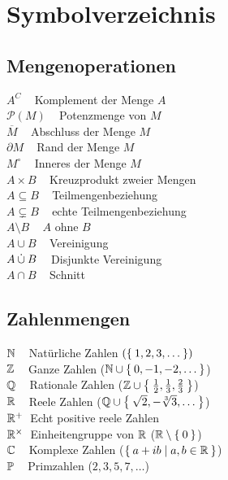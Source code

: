 \chapter*{Symbolverzeichnis}
\begin{minipage}[t]{0.45\textwidth}
\section*{Mengenoperationen}
$A^C\;\;\;$ Komplement der Menge $A$\\
$\mathcal{P}(M)\;\;\;$ Potenzmenge von $M$\\
$\overline{M}\;\;\;$ Abschluss der Menge $M$\\
$\partial M\;\;\;$ Rand der Menge $M$\\
$M^\circ\;\;\;$ Inneres der Menge $M$\\
$A \times B\;\;\;$ Kreuzprodukt zweier Mengen\\
$A \subseteq B\;\;\;$ Teilmengenbeziehung\\
$A \subsetneq B\;\;\;$ echte Teilmengenbeziehung\\
$A \setminus B\;\;\;$ $A$ ohne $B$\\
$A \cup B\;\;\;$ Vereinigung\\
$A \mathbin{\dot{\cup}} B\;\;\;$ Disjunkte Vereinigung\\
$A \cap B\;\;\;$ Schnitt\\
\section*{Zahlenmengen}
$\mathbb{N}\;\;\;$ Natürliche Zahlen $(\Set{1, 2, 3, \dots})$\\
$\mathbb{Z}\;\;\;$ Ganze Zahlen ($\mathbb{N} \cup \Set{0, -1, -2, \dots}$)\\
$\mathbb{Q}\;\;\;$ Rationale Zahlen ($\mathbb{Z} \cup \Set{\frac{1}{2}, \frac{1}{3}, \frac{2}{3}}$)\\
$\mathbb{R}\;\;\;$ Reele Zahlen ($\mathbb{Q} \cup \Set{\sqrt{2}, -\sqrt[3]{3}, \dots}$)\\
$\mathbb{R}^+\;$ Echt positive reele Zahlen\\
$\mathbb{R}^\times\;$ Einheitengruppe von $\mathbb{R}$ ($\mathbb{R} \setminus \Set{0}$)\\
$\mathbb{C}\;\;\;$ Komplexe Zahlen ($\Set{a+ib|a,b \in \ensuremath{\mathbb{R}}}$)\\
$\mathbb{P}\;\;\;$ Primzahlen ($2, 3, 5, 7, \dots$)\\

\end{minipage}
